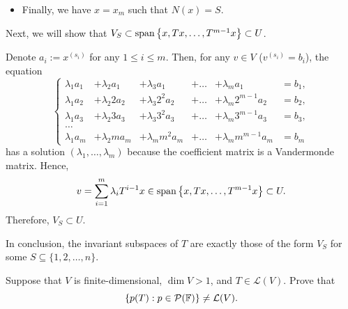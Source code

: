 \documentclass{article}
\begin{document}
\begin{solution}
\begin{itemize}
    \item Finally, we have \( x=x_m \) such that \( N(x)=S \).
  \end{itemize}\par
  Next, we will show that \( V_S\subset\operatorname{span}\left\{ x,Tx,\dots,T^{m-1}x \right\}\subset U \).\par
  Denote \( a_i:=x^{(s_i)} \) for any \( 1\le i\le m \). Then, for any \( v\in V \) (\( v^{(s_i)}=b_i \)), the equation
  \[\left\{
    \begin{matrix}
      \lambda_1a_1&+\lambda_2a_1&+\lambda_3a_1&+\dots&+\lambda_m a_1&=b_1,\\
      \lambda_1a_2&+\lambda_2 2a_2&+\lambda_3 2^2a_2&+\dots&+\lambda_m 2^{m-1}a_2&=b_2,\\
      \lambda_1a_3&+\lambda_2 3a_3&+\lambda_3 3^2a_3&+\dots&+\lambda_m 3^{m-1}a_3&=b_3,\\
      \dots\\
      \lambda_1a_m&+\lambda_2 ma_m&+\lambda_m m^2 a_m&+\dots&+\lambda_m m^{m-1}a_m&=b_m
    \end{matrix}
  \right.\]
  has a solution \( (\lambda_1,\dots,\lambda_m) \) because the coefficient matrix is a Vandermonde matrix. Hence, 
  \[ v=\sum_{i=1}^{m} \lambda_i T^{i-1}x \in \operatorname{span}\left\{ x,Tx,\dots,T^{m-1}x \right\}\subset U. \]
  Therefore, \( V_S\subset U \). \par
  In conclusion, the invariant subspaces of \( T \) are exactly those of the form \( V_S \) for some \( S\subseteq \{1,2,\dots,n\} \).
\end{solution}



\begin{problem}[5A-43]
Suppose that $V$ is finite-dimensional, $\dim V > 1$, and $T \in \mathcal{L}(V)$. Prove that
\[
\{p(T) : p \in \mathcal{P}(\mathbb{F})\} \neq \mathcal{L}(V).
\]
\end{problem}
\end{document}
